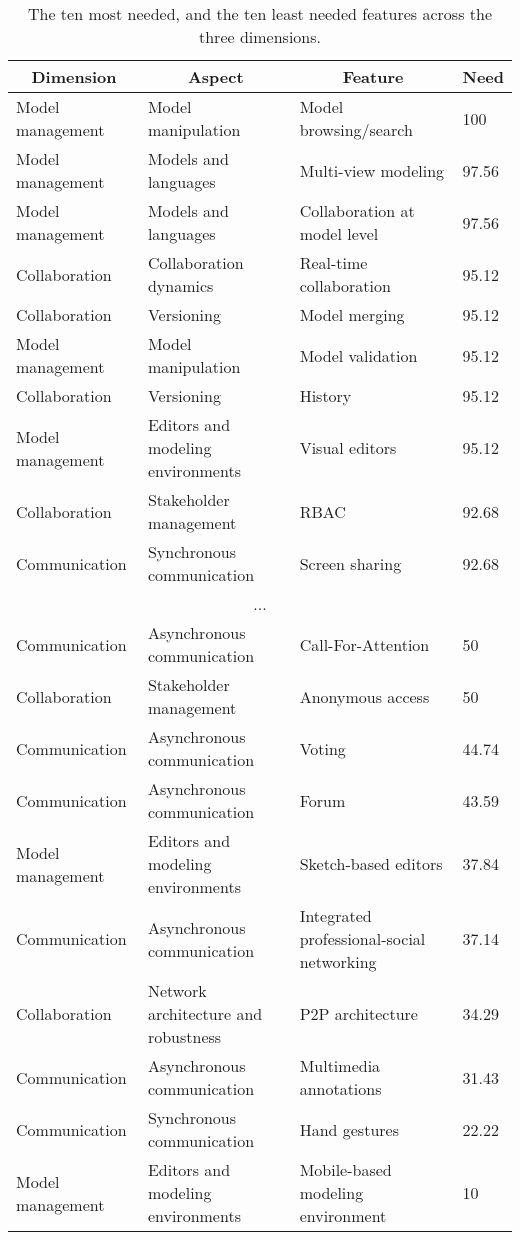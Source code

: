 
  \begin{table*}[]
  \centering
  \notsotiny
  \caption{ The ten most needed, and the ten least needed features across the three dimensions.}
\label{tab:top-bottom-need}
\begin{tabular}{@{}llll@{}}
  \toprule
\multicolumn{1}{c}{\textbf{Dimension}} & \multicolumn{1}{c}{\textbf{Aspect}} & \multicolumn{1}{c}{\textbf{Feature}} & \multicolumn{1}{c}{\textbf{Need}} \\ 

  \midrule
  Model management & Model manipulation & Model browsing/search & 100 \\ 
Model management & Models and languages & Multi-view modeling & 97.56 \\ 
Model management & Models and languages & Collaboration at model level & 97.56 \\ 
Collaboration & Collaboration dynamics & Real-time collaboration & 95.12 \\ 
Collaboration & Versioning & Model merging & 95.12 \\ 
Model management & Model manipulation & Model validation & 95.12 \\ 
Collaboration & Versioning & History & 95.12 \\ 
Model management & Editors and modeling environments & Visual editors & 95.12 \\ 
Collaboration & Stakeholder management & RBAC & 92.68 \\ 
Communication & Synchronous communication & Screen sharing & 92.68 \\ 
\multicolumn{4}{c}{...} \\ 
Communication & Asynchronous communication & Call-For-Attention & 50 \\ 
Collaboration & Stakeholder management & Anonymous access & 50 \\ 
Communication & Asynchronous communication & Voting & 44.74 \\ 
Communication & Asynchronous communication & Forum & 43.59 \\ 
Model management & Editors and modeling environments & Sketch-based editors & 37.84 \\ 
Communication & Asynchronous communication & Integrated professional-social networking & 37.14 \\ 
Collaboration & Network architecture and robustness & P2P architecture & 34.29 \\ 
Communication & Asynchronous communication & Multimedia annotations & 31.43 \\ 
Communication & Synchronous communication & Hand gestures & 22.22 \\ 
Model management & Editors and modeling environments & Mobile-based modeling environment & 10 \\ 
\bottomrule
  \end{tabular}%
  \end{table*}